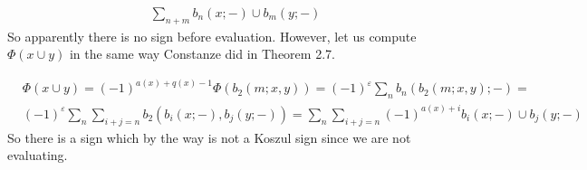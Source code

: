 \documentclass[twoside]{article}
\begin{document}
\begin{align*}
\sum_{n+m}b_n(x;-)\cup b_m(y;-)
\end{align*}
So apparently there is no sign before evaluation. However, let us compute $\Phi(x\cup y)$ in the same way Constanze did in Theorem 2.7.

\begin{align*}
&\Phi(x\cup y)=(-1)^{a(x)+q(x)-1}\Phi(b_2(m;x,y))=(-1)^{\varepsilon}\sum_n b_n(b_2(m;x,y);-)=\\
&(-1)^{\varepsilon}\sum_n\sum_{i+j=n}b_2(b_i(x;-),b_j(y;-))=\sum_n\sum_{i+j=n}(-1)^{a(x)+i}b_i(x;-)\cup b_j(y;-)
\end{align*}
So there is a sign which by the way is not a Koszul sign since we are not evaluating.

%
%
%
%
%
%
%
\end{document}
